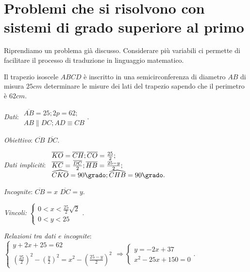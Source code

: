 
\section{Problemi che si risolvono con sistemi di grado superiore al primo}
Riprendiamo un problema già discusso. Considerare più variabili ci permette di facilitare il processo di traduzione in linguaggio matematico.

\begin{problema}
Il trapezio isoscele ${ABCD}$ è inscritto in una semicirconferenza di diametro ${AB}$ di misura $25\unit{cm}$ determinare le misure dei lati del trapezio sapendo che il perimetro è $62\unit{cm}$.
\end{problema}
\begin{multicols}{2}
\emph{Dati}: $\begin{array}{l}\overline{AB}=25;2p=62;\\{AB}\parallel {DC};{AD}\equiv {CB}\end{array}$.

\emph{Obiettivo}: $\overline{CB}$ $\overline{DC}$.

\emph{Dati impliciti}: $\begin{array}{l}
\overline{{KO}}=\overline{{CH}}; \overline{{CO}}=\frac{25} 2;\\ \overline{{KC}}=\frac{\overline{{DC}}} 2; \overline{{HB}}=\frac{25-y} 2;\\ \widehat {{CKO}}=90\grado; \widehat {{CHB}}=90\grado.\end{array}$

\emph{Incognite}: $\overline{{CB}}=x$ $\overline{{DC}}=y$.

\emph{Vincoli: } $\left\{\begin{array}{l}0<x<\frac{25} 2\sqrt 2\\0<y<25 \end{array}\right.$.
\begin{center}

\end{center}
\end{multicols}

\emph{Relazioni tra dati e incognite}:
$ \left\{\begin{array}{l}{y+2x+25=62}\\{\left(\frac{25} 2\right)^2-\left(\frac y 2\right)^2=x^2-\left(\frac{25-y} 2\right)^2}\end{array}\right. \Rightarrow \left\{\begin{array}{l}{y=-2x+37}\\{x^2-25x+150=0}\end{array}\right.. $

